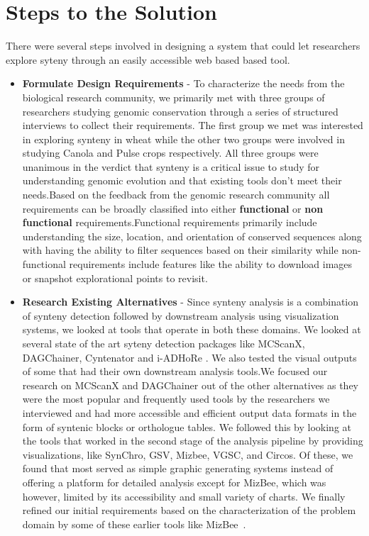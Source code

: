 \section{Steps to the Solution} 
There were several steps involved in designing a system that could let researchers explore syteny through an easily accessible web based based tool.

\begin{itemize}
    
    \item \textbf{Formulate Design Requirements} -
    To characterize the needs from the biological research community, we primarily met with three groups of researchers studying genomic conservation through a series of structured interviews to collect their requirements. The first group we met was interested in exploring synteny in wheat while the other two groups were involved in studying Canola and Pulse crops respectively. All three groups were unanimous in the verdict that synteny is a critical issue to study for understanding genomic evolution and that existing tools don't meet their needs.Based on the feedback from the genomic research community all requirements can be broadly classified into either \textbf{functional} or \textbf{non functional} requirements.Functional requirements primarily include understanding the size, location, and orientation of conserved sequences along with having the ability to filter sequences based on their similarity while non-functional requirements include features like the ability to download images or snapshot explorational points to revisit.
    
    \item \textbf{Research Existing Alternatives} - 
    Since synteny analysis is a combination of synteny detection followed by downstream analysis using visualization systems, we looked at tools that operate in both these domains. We looked at several state of the art syteny detection packages like MCScanX, DAGChainer, Cyntenator and i-ADHoRe \cite{wang2012mcscanx,haas2004dagchainer,rodelsperger2010cyntenator,proost2011adhore}. We also tested the visual outputs of some that had their own downstream analysis tools.We focused our research on MCScanX and DAGChainer out of the other alternatives as they were the most popular and frequently used tools by the researchers we interviewed and had more accessible and  efficient output data formats in the form of syntenic blocks or orthologue tables. We followed this by looking at the tools that worked in the second stage of the analysis pipeline by providing visualizations, like SynChro, GSV, Mizbee, VGSC, and Circos\cite{drillon2014synchro,revanna2011gsv,Meyer2009,xu2016vgsc}. Of these, we found that most served as simple graphic generating systems instead of offering a platform for detailed analysis except for MizBee, which was however, limited by its accessibility and small variety of charts. We finally refined our initial requirements based on the characterization of the problem domain by some of these earlier tools like MizBee~\cite{Meyer2009}.


\end{itemize}
